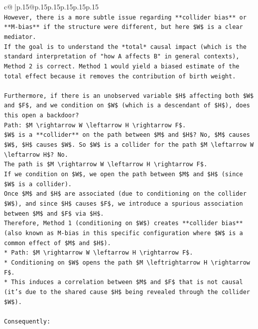 \documentclass{article}
\begin{document}
{\begin{supertabular}{c@{$\;$}|p{.15\linewidth}@{}p{.15\linewidth}p{.15\linewidth}p{.15\linewidth}p{.15\linewidth}p{.15\linewidth}}
{{{\\ 
\texttt{However, there is a more subtle issue regarding **collider bias** or **M{-}bias** if the structure were different, but here \$W\$ is a clear mediator.} \\
\texttt{If the goal is to understand the *total* causal impact (which is the standard interpretation of "how A affects B" in general contexts), Method 2 is correct. Method 1 would yield a biased estimate of the total effect because it removes the contribution of birth weight.} \\
\\ 
\texttt{Furthermore, if there is an unobserved variable \$H\$ affecting both \$W\$ and \$F\$, and we condition on \$W\$ (which is a descendant of \$H\$), does this open a backdoor?} \\
\texttt{Path: \$M \textbackslash{}rightarrow W \textbackslash{}leftarrow H \textbackslash{}rightarrow F\$.} \\
\texttt{\$W\$ is a **collider** on the path between \$M\$ and \$H\$? No, \$M\$ causes \$W\$, \$H\$ causes \$W\$. So \$W\$ is a collider for the path \$M \textbackslash{}leftarrow W \textbackslash{}leftarrow H\$? No.} \\
\texttt{The path is \$M \textbackslash{}rightarrow W \textbackslash{}leftarrow H \textbackslash{}rightarrow F\$.} \\
\texttt{If we condition on \$W\$, we open the path between \$M\$ and \$H\$ (since \$W\$ is a collider).} \\
\texttt{Once \$M\$ and \$H\$ are associated (due to conditioning on the collider \$W\$), and since \$H\$ causes \$F\$, we introduce a spurious association between \$M\$ and \$F\$ via \$H\$.} \\
\texttt{Therefore, Method 1 (conditioning on \$W\$) creates **collider bias** (also known as M{-}bias in this specific configuration where \$W\$ is a common effect of \$M\$ and \$H\$).} \\
\texttt{*   Path: \$M \textbackslash{}rightarrow W \textbackslash{}leftarrow H \textbackslash{}rightarrow F\$.} \\
\texttt{*   Conditioning on \$W\$ opens the path \$M \textbackslash{}leftrightarrow H \textbackslash{}rightarrow F\$.} \\
\texttt{*   This induces a correlation between \$M\$ and \$F\$ that is not causal (it's due to the shared cause \$H\$ being revealed through the collider \$W\$).} \\
\\ 
\texttt{Consequently:} \\
}}}
\end{supertabular}}
\end{document}
